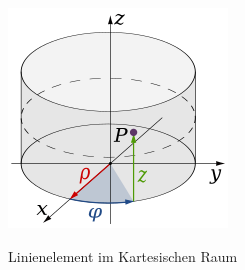 

\begin{figure}
	\centering
	\includegraphics[width=0.7\linewidth]{papers/geodaeten/Abbildungen/Linienelemente/LinZyl1}
	\caption{Linienelement im Kartesischen Raum}
	\label{geodaeten:figure:Linienelemente:Zylinder:figure2}
	\cite{geodaeten:polarkoordinaten}
\end{figure}

